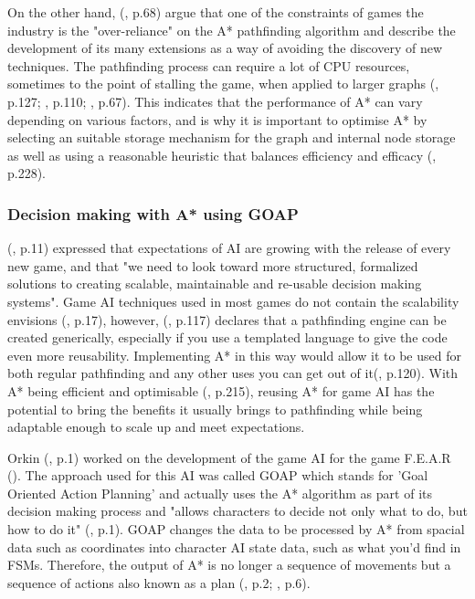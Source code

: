 \documentclass[11pt, a4paper]{article}
\begin{document}
On the other hand, \citeauthor{graham2003pathfinding} (\citeyear{graham2003pathfinding}, p.68) argue that one of the constraints of games the industry is the "over-reliance" on the A* pathfinding algorithm and describe the development of its many extensions as a way of avoiding the discovery of new techniques. The pathfinding process can require a lot of CPU resources, sometimes to the point of stalling the game, when applied to larger graphs (\cite{cui2011based}, p.127; \cite{stentz1996map}, p.110; \cite{graham2003pathfinding}, p.67). This indicates that the performance of A* can vary depending on various factors, and is why it is important to optimise A* by selecting an suitable storage mechanism for the graph and internal node storage as well as using a reasonable heuristic that balances efficiency and efficacy (\cite{millington2019ai}, p.228).

\subsubsection{Decision making with A* using GOAP}

\citeauthor{orkin2003applying} (\citeyear{orkin2003applying}, p.11) expressed that expectations of AI are growing with the release of every new game, and that "we need to look toward more structured, formalized solutions to creating scalable, maintainable and re-usable decision making systems". Game AI techniques used in most games do not contain the scalability \citeauthor{orkin2003applying} envisions (\cite{laird2001human}, p.17), however, \citeauthor{higgins2002generic} (\citeyear{higgins2002generic}, p.117) declares that a pathfinding engine can be created generically, especially if you use a templated language to give the code even more reusability. Implementing A* in this way would allow it to be used for both regular pathfinding and any other uses you can get out of it(\cite{higgins2002generic}, p.120). With A* being efficient and optimisable (\cite{millington2019ai}, p.215), reusing A* for game AI has the potential to bring the benefits it usually brings to pathfinding while being adaptable enough to scale up and meet expectations.

Orkin (\citeyear{orkin2006three}, p.1) worked on the development of the game AI for the game F.E.A.R (\cite{FEAR}). The approach used for this AI was called GOAP which stands for 'Goal Oriented Action Planning' and actually uses the A* algorithm as part of its decision making process and "allows characters to decide not only what to do, but how to do it" (\cite{orkin2003applying}, p.1). GOAP changes the data to be processed by A* from spacial data such as coordinates into character AI state data, such as what you'd find in FSMs. Therefore, the output of A* is no longer a sequence of movements but a sequence of actions also known as a plan (\cite{orkin2003applying}, p.2; \cite{tozour2002evolution}, p.6).
\end{document}
